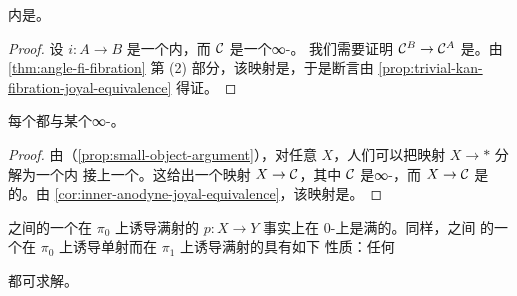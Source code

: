 \begin{corollary}\label{cor:inner-anodyne-joyal-equivalence}
内\trAnodyneMap{}是\trJoyalEquivalence{}。
\end{corollary}

\begin{proof}
设 $i\colon A \to B$ 是一个内\trAnodyneMap{}，而 $\mathcal{C}$ 是一个∞-\trCategory{}。
我们需要证明 $\mathcal{C}^B \to \mathcal{C}^A$ 是\trJoyalEquivalence{}。由
\cref{thm:angle-fi-fibration} 第 (2) 部分，该映射是\trTrivialFibration{}，于是断言由
\cref{prop:trivial-kan-fibration-joyal-equivalence} 得证。
\end{proof}

\begin{corollary}\label{cor:simplicial-set-joyal-equivalent}
每个\trSimplicialSet{}都与某个∞-\trCategory{}\trJoyalEquivalence{}。
\end{corollary}

\begin{proof}
由\trSmallObjectArgument{}（\cref{prop:small-object-argument}），对任意%
\trSimplicialSet{} $X$，人们可以把映射 $X \to \ast$ 分解为一个内%
\trAnodyneMap{}接上一个\trInnerFibration{}。这给出一个映射 $X \to \mathcal{C}$，其中
$\mathcal{C}$ 是∞-\trCategory{}，而 $X \to \mathcal{C}$ 是\trInnerAnodyne{}的。由
\cref{cor:inner-anodyne-joyal-equivalence}，该映射是\trJoyalEquivalence{}。
\end{proof}

\begin{lemma}\label{lem:kan-fibration-surjection-pi0}
\trKanComplex{}之间的一个在 $\pi_0$ 上诱导满射的\trKanFibration{}%
$p\colon X \to Y$ 事实上在 $0$-\trSimplex{}上是满的。同样，\trKanComplex{}之间
的一个在 $\pi_0$ 上诱导单射而在 $\pi_1$ 上诱导满射的\trKanFibration{}具有如下
性质：任何\trLiftingProblem{}%
\begin{center}
\end{center}
都可求解。
\end{lemma}

